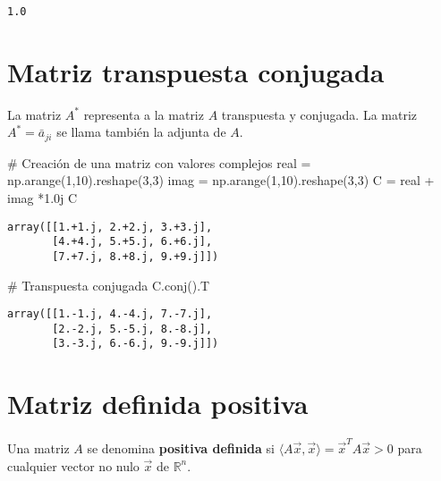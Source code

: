 \documentclass[
  letterpaper,
  DIV=11,
  numbers=noendperiod]{scrreprt}
\newenvironment{Shaded}{\begin{snugshade}}{\end{snugshade}}
\newcommand{\CommentTok}[1]{\textcolor[rgb]{0.37,0.37,0.37}{#1}}
\newcommand{\DecValTok}[1]{\textcolor[rgb]{0.68,0.00,0.00}{#1}}
\newcommand{\NormalTok}[1]{\textcolor[rgb]{0.00,0.23,0.31}{#1}}
\newcommand{\OperatorTok}[1]{\textcolor[rgb]{0.37,0.37,0.37}{#1}}
\newcommand{\OtherTok}[1]{\textcolor[rgb]{0.00,0.23,0.31}{#1}}
\begin{document}
\begin{verbatim}
1.0
\end{verbatim}

\section{Matriz transpuesta
conjugada}\label{matriz-transpuesta-conjugada}

La matriz \(A^*\) representa a la matriz \(A\) transpuesta y conjugada.
La matriz \(A^* = {\bar{a}_{ji}}\) se llama también la adjunta de \(A\).

\begin{Shaded}
\begin{Highlighting}[]
\CommentTok{\# Creación de una matriz con valores complejos}
\NormalTok{real }\OperatorTok{=}\NormalTok{ np.arange(}\DecValTok{1}\NormalTok{,}\DecValTok{10}\NormalTok{).reshape(}\DecValTok{3}\NormalTok{,}\DecValTok{3}\NormalTok{)}
\NormalTok{imag }\OperatorTok{=}\NormalTok{ np.arange(}\DecValTok{1}\NormalTok{,}\DecValTok{10}\NormalTok{).reshape(}\DecValTok{3}\NormalTok{,}\DecValTok{3}\NormalTok{)}
\NormalTok{C }\OperatorTok{=}\NormalTok{  real }\OperatorTok{+}\NormalTok{ imag }\OperatorTok{*}\OtherTok{1.0j}
\NormalTok{C}
\end{Highlighting}
\end{Shaded}

\begin{verbatim}
array([[1.+1.j, 2.+2.j, 3.+3.j],
       [4.+4.j, 5.+5.j, 6.+6.j],
       [7.+7.j, 8.+8.j, 9.+9.j]])
\end{verbatim}

\begin{Shaded}
\begin{Highlighting}[]
\CommentTok{\# Transpuesta conjugada}
\NormalTok{C.conj().T}
\end{Highlighting}
\end{Shaded}

\begin{verbatim}
array([[1.-1.j, 4.-4.j, 7.-7.j],
       [2.-2.j, 5.-5.j, 8.-8.j],
       [3.-3.j, 6.-6.j, 9.-9.j]])
\end{verbatim}

\section{Matriz definida positiva}\label{matriz-definida-positiva}

Una matriz \(A\) se denomina \textbf{positiva definida} si
\(\langle A\vec{x}, \vec{x}\rangle = \vec{x}^T A\vec{x} > 0\) para
cualquier vector no nulo \(\vec{x}\) de \(\mathbb{R}^n\).
\end{document}
